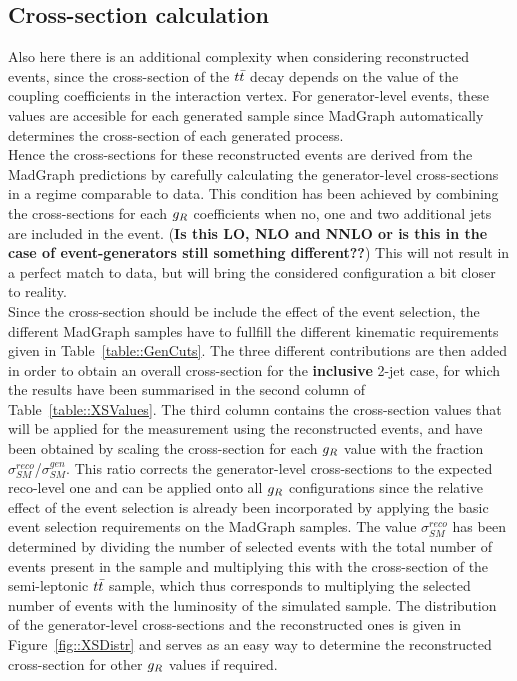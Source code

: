 \subsection{Cross-section calculation} \label{subsec::XSReco}

Also here there is an additional complexity when considering reconstructed events, since the cross-section of the $t\bar{t}$ decay depends on the value of the coupling coefficients in the interaction vertex. For generator-level events, these values are accesible for each generated sample since MadGraph automatically determines the cross-section of each generated process.
\\
Hence the cross-sections for these reconstructed events are derived from the MadGraph predictions by carefully calculating the generator-level cross-sections in a regime comparable to data. 
This condition has been achieved by combining the cross-sections for each $g_{R}$ coefficients when no, one and two additional jets are included in the event. (\textbf{Is this LO, NLO and NNLO or is this in the case of event-generators still something different??})
This will not result in a perfect match to data, but will bring the considered configuration a bit closer to reality. 
\\
Since the cross-section should be include the effect of the event selection, the different MadGraph samples have to fullfill the different kinematic requirements given in Table~\ref{table::GenCuts}. The three different contributions are then added in order to obtain an overall cross-section for the \textbf{inclusive} 2-jet case, for which the results have been summarised in the second column of Table~\ref{table::XSValues}.
The third column contains the cross-section values that will be applied for the measurement using the reconstructed events, and have been obtained by scaling the cross-section for each $g_{R}$ value with the fraction $\sigma_{SM}^{reco}$/$\sigma_{SM}^{gen}$. This ratio corrects the generator-level cross-sections to the expected reco-level one and can be applied onto all $g_{R}$ configurations since the relative effect of the event selection is already been incorporated by applying the basic event selection requirements on the MadGraph samples. The value $\sigma_{SM}^{reco}$ has been determined by dividing the number of selected events with the total number of events present in the sample and multiplying this with the cross-section of the semi-leptonic $t\bar{t}$ sample, which thus corresponds to multiplying the selected number of events with the luminosity of the simulated sample. The distribution of the generator-level cross-sections and the reconstructed ones is given in Figure~\ref{fig::XSDistr} and serves as an easy way to determine the reconstructed cross-section for other $g_{R}$ values if required.

